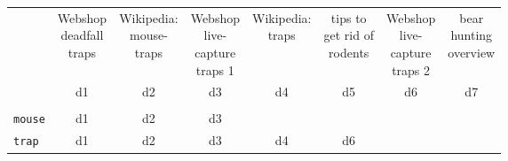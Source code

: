 				\begin{table}[H]
					\centering
					\begin{tabular}{|l|c|c|c|c|c|c|c|}
						\cline{2-8}
						\multicolumn{1}{c|}{} & \makecell{Webshop \\ deadfall \\ traps} & \makecell{Wikipedia: \\ mouse- \\ traps} & \makecell{Webshop \\ live- \\ capture \\ traps 1} & \makecell{Wikipedia: \\ traps} & \makecell{tips to \\ get rid of \\ rodents} & \makecell{Webshop \\ live- \\ capture \\ traps 2} & \makecell{bear \\ hunting \\ overview} \\ \cline{2-8}
						\multicolumn{1}{c|}{} & d1                                      & d2                                       & d3                                                & d4                             & d5                                          & d6                                                & d7                                     \\ \cline{2-8}
						\multicolumn{8}{c}{}                                                                                                                                                                                                                                                                                                                       \\ \cline{1-4}
						\texttt{mouse}        & d1                                      & d2                                       & d3                                                & \multicolumn{4}{c}{}                                                                                                                                                      \\ \cline{1-6}
						\texttt{trap}         & d1                                      & d2                                       & d3                                                & d4                             & d6                                          & \multicolumn{2}{c}{}                                                                       \\ \cline{1-6}

\end{tabular}
\end{table}

